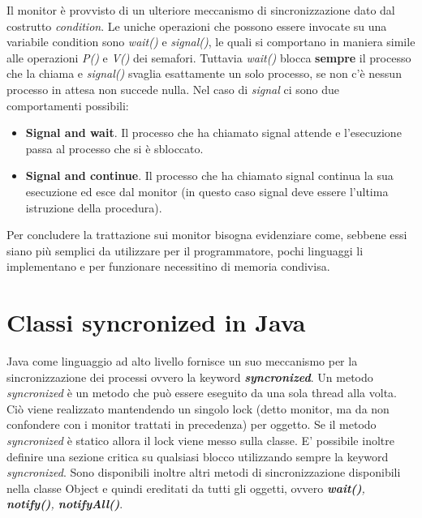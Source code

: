 Il monitor è provvisto di un ulteriore meccanismo di sincronizzazione dato dal costrutto \emph{condition}. Le uniche operazioni che possono essere invocate su una variabile condition sono \emph{wait()} e \emph{signal()}, le quali si comportano in maniera simile alle operazioni \emph{P()} e \emph{V()} dei semafori. Tuttavia \emph{wait()} blocca \textbf{sempre} il processo che la chiama e \emph{signal()} svaglia esattamente un solo processo, se non c'è nessun processo in attesa non succede nulla. Nel caso di \emph{signal} ci sono due comportamenti possibili:
\begin{itemize}
	\item \textbf{Signal and wait}. Il processo che ha chiamato signal attende e l'esecuzione passa al processo che si è sbloccato.
	\item \textbf{Signal and continue}. Il processo che ha chiamato signal continua la sua esecuzione ed esce dal monitor (in questo caso signal deve essere l'ultima istruzione della procedura).
\end{itemize}

Per concludere la trattazione sui monitor bisogna evidenziare come, sebbene essi siano più semplici da utilizzare per il programmatore, pochi linguaggi li implementano e per funzionare necessitino di memoria condivisa.

\section{Classi syncronized in Java}
Java come linguaggio ad alto livello fornisce un suo meccanismo per la sincronizzazione dei processi ovvero la keyword \emph{\textbf{syncronized}}.
Un metodo \emph{syncronized} è un metodo che può essere eseguito da una sola thread alla volta. Ciò viene realizzato mantendendo un singolo lock (detto monitor, ma da non confondere con i monitor trattati in precedenza) per oggetto. Se il metodo \emph{syncronized} è statico allora il lock viene messo sulla classe.
E' possibile inoltre definire una sezione critica su qualsiasi blocco utilizzando sempre la keyword \emph{syncronized}.
Sono disponibili inoltre altri metodi di sincronizzazione disponibili nella classe Object e quindi ereditati da tutti gli oggetti, ovvero \emph{\textbf{wait()}, \textbf{notify()}, \textbf{notifyAll()}}.
